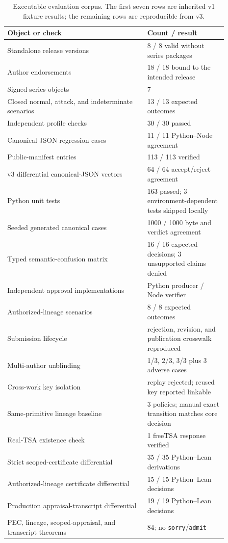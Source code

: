 \documentclass[11pt]{article}
\begin{document}
\begin{table}[H]
\centering
\caption{Executable evaluation corpus. The first seven rows are inherited v1 fixture results; the remaining rows are reproducible from v3.}
\begin{tabular}{p{0.57\linewidth}p{0.32\linewidth}}
\toprule
Object or check & Count / result \\
\midrule
Standalone release versions & 8 / 8 valid without series packages \\
Author endorsements & 18 / 18 bound to the intended release \\
Signed series objects & 7 \\
Closed normal, attack, and indeterminate scenarios & 13 / 13 expected outcomes \\
Independent profile checks & 30 / 30 passed \\
Canonical JSON regression cases & 11 / 11 Python--Node agreement \\
Public-manifest entries & 113 / 113 verified \\
v3 differential canonical-JSON vectors & 64 / 64 accept/reject agreement \\
Python unit tests & 163 passed; 3 environment-dependent tests skipped locally \\
Seeded generated canonical cases & 1000 / 1000 byte and verdict agreement \\
Typed semantic-confusion matrix & 16 / 16 expected decisions; 3 unsupported claims denied \\
Independent approval implementations & Python producer / Node verifier \\
Authorized-lineage scenarios & 8 / 8 expected outcomes \\
Submission lifecycle & rejection, revision, and publication crosswalk reproduced \\
Multi-author unblinding & 1/3, 2/3, 3/3 plus 3 adverse cases \\
Cross-work key isolation & replay rejected; reused key reported linkable \\
Same-primitive lineage baseline & 3 policies; manual exact transition matches core decision \\
Real-TSA existence check & 1 freeTSA response verified \\
Strict scoped-certificate differential & 35 / 35 Python--Lean derivations \\
Authorized-lineage certificate differential & 15 / 15 Python--Lean decisions \\
Production appraisal-transcript differential & 19 / 19 Python--Lean decisions \\
PEC, lineage, scoped-appraisal, and transcript theorems & 84; no \texttt{sorry}/\texttt{admit} \\
\bottomrule
\end{tabular}
\end{table}
\end{document}
